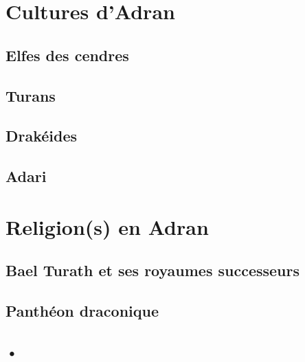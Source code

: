 \documentclass[10pt,a4paper]{book}
\begin{document}
\chapter{Cultures d'Adran}
\section{Elfes des cendres}
\section{Turans}
\section{Drakéides}
\section{Adari}
\chapter{Religion(s) en Adran}
\section{Bael Turath et ses royaumes successeurs}
\section{Panthéon draconique}
\section{•}
\end{document}
